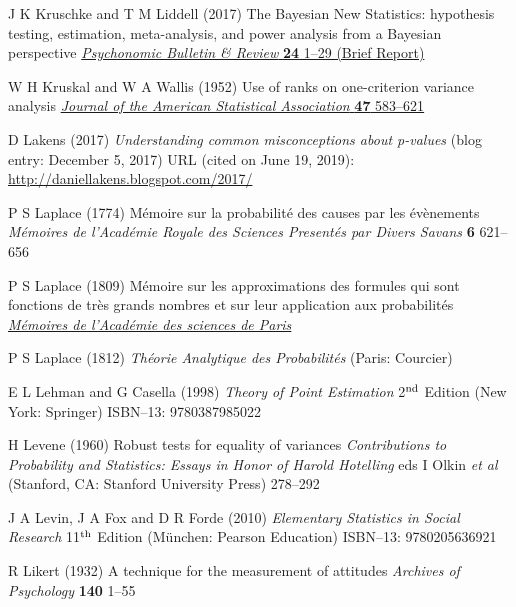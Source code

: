 \begin{thebibliography}{99}
J K Kruschke and T M Liddell (2017) The Bayesian New Statistics: 
hypothesis testing, estimation, meta-analysis, and power analysis 
from a Bayesian perspective 
\href{https://doi.org/10.3758/s13423-016-1221-4}{\textit{Psychonomic 
Bulletin \& Review} \textbf{24} 1--29 (Brief Report)}

W H Kruskal and W A Wallis
(1952) Use of ranks on one-criterion variance analysis
\href{http://www.jstor.org/stable/2280779}{\textit{Journal of the 
American Statistical Association} \textbf{47} 583--621}

D Lakens
(2017) \textit{Understanding common misconceptions about p-values}
(blog entry: December 5, 2017) URL (cited on June 19, 2019):
\href{http://daniellakens.blogspot.com/2017/}{http://daniellakens.blogspot.com/2017/}

P S Laplace
(1774) M\'{e}moire sur la probabilit\'{e} des causes par les 
\'{e}v\`{e}nements \textit{M\'{e}moires de l'Acad\'{e}mie Royale
des  Sciences Present\'{e}s par Divers Savans} \textbf{6} 621--656

P S Laplace
(1809) M\'{e}moire sur les approximations des formules qui sont 
fonctions de tr\`{e}s grands nombres et sur leur application aux 
probabilit\'{e}s
\href{http://gallica.bnf.fr/ark:/12148/bpt6k77600r/f306}{\textit{M\'{e}moires de l'Acad\'{e}mie des sciences de Paris}}

P S Laplace
(1812) \textit{Th\'{e}orie Analytique des Probabilit\'{e}s} (Paris: 
Courcier)

E L Lehman and G Casella
(1998) \textit{Theory of Point Estimation}
2$^{\rm nd}$ Edition
(New York: Springer) ISBN--13: 9780387985022

H Levene
(1960) Robust tests for equality of variances
\textit{Contributions to Probability and Statistics: Essays in Honor 
of Harold Hotelling} eds I Olkin \textit{et al} (Stanford, CA: 
Stanford University Press) 278--292

J A Levin, J A Fox and D R Forde
(2010) \textit{Elementary Statistics in Social Research}
11$^{\rm th}$ Edition
(M\"{u}nchen: Pearson Education) ISBN--13: 9780205636921

R Likert
(1932) A technique for the measurement of attitudes
\textit{Archives of Psychology} \textbf{140} 1--55


\end{thebibliography}
